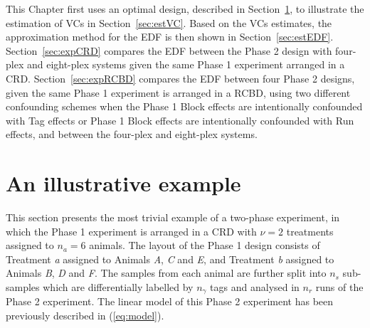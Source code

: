   
This Chapter first uses an optimal design, described in Section~\ref{sec:expDes}, to illustrate the estimation of VCs in Section~\ref{sec:estVC}. Based on the VCs estimates, the approximation method for the EDF is then shown in Section~\ref{sec:estEDF}. Section~\ref{sec:expCRD} compares the EDF between the Phase 2 design with four-plex and eight-plex systems given the same Phase 1 experiment arranged in a CRD. Section~\ref{sec:expRCBD} compares the EDF between four Phase 2 designs, given the same Phase 1 experiment is arranged in a RCBD, using two different confounding schemes when the Phase 1 Block effects are intentionally confounded with Tag effects or Phase 1 Block effects are intentionally confounded with Run effects, and between the four-plex and eight-plex systems.   

\section{An illustrative example}
\label{sec:expDes}
This section presents the most trivial example of a two-phase experiment, in which the Phase 1 experiment is arranged in a CRD with $\nu = 2$ treatments assigned to $n_a = 6$ animals. The layout of the Phase 1 design consists of Treatment \textit{a} assigned to Animals \textit{A}, \textit{C} and \textit{E}, and Treatment \textit{b} assigned to Animals \textit{B}, \textit{D} and \textit{F}. The samples from each animal are further split into $n_s$ sub-samples which are differentially labelled by $n_\gamma$ tags and analysed in $n_r$ runs of the Phase 2 experiment. The linear model of this Phase 2 experiment has been previously described in (\ref{eq:model}). 

